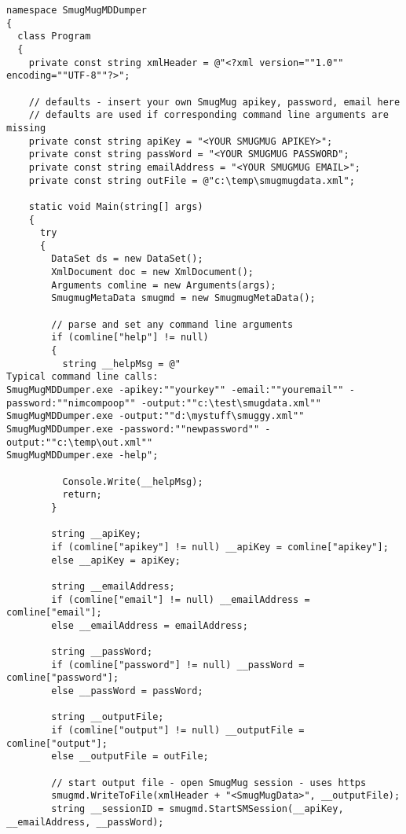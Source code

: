 \lstset{style=sharpc, label=lst:scr323X0}
\begin{lstlisting}
namespace SmugMugMDDumper
{
  class Program
  {
    private const string xmlHeader = @"<?xml version=""1.0"" encoding=""UTF-8""?>";

    // defaults - insert your own SmugMug apikey, password, email here
    // defaults are used if corresponding command line arguments are missing
    private const string apiKey = "<YOUR SMUGMUG APIKEY>";
    private const string passWord = "<YOUR SMUGMUG PASSWORD";
    private const string emailAddress = "<YOUR SMUGMUG EMAIL>";
    private const string outFile = @"c:\temp\smugmugdata.xml";

    static void Main(string[] args)
    {
      try
      {
        DataSet ds = new DataSet();
        XmlDocument doc = new XmlDocument();
        Arguments comline = new Arguments(args);
        SmugmugMetaData smugmd = new SmugmugMetaData();

        // parse and set any command line arguments
        if (comline["help"] != null)
        {
          string __helpMsg = @"
Typical command line calls:
SmugMugMDDumper.exe -apikey:""yourkey"" -email:""youremail"" -password:""nimcompoop"" -output:""c:\test\smugdata.xml""
SmugMugMDDumper.exe -output:""d:\mystuff\smuggy.xml""
SmugMugMDDumper.exe -password:""newpassword"" -output:""c:\temp\out.xml""
SmugMugMDDumper.exe -help";

          Console.Write(__helpMsg);
          return;
        }

        string __apiKey;
        if (comline["apikey"] != null) __apiKey = comline["apikey"];
        else __apiKey = apiKey;

        string __emailAddress;
        if (comline["email"] != null) __emailAddress = comline["email"];
        else __emailAddress = emailAddress;

        string __passWord;
        if (comline["password"] != null) __passWord = comline["password"];
        else __passWord = passWord;

        string __outputFile;
        if (comline["output"] != null) __outputFile = comline["output"];
        else __outputFile = outFile;

        // start output file - open SmugMug session - uses https
        smugmd.WriteToFile(xmlHeader + "<SmugMugData>", __outputFile);
        string __sessionID = smugmd.StartSMSession(__apiKey, __emailAddress, __passWord);


\end{lstlisting}
